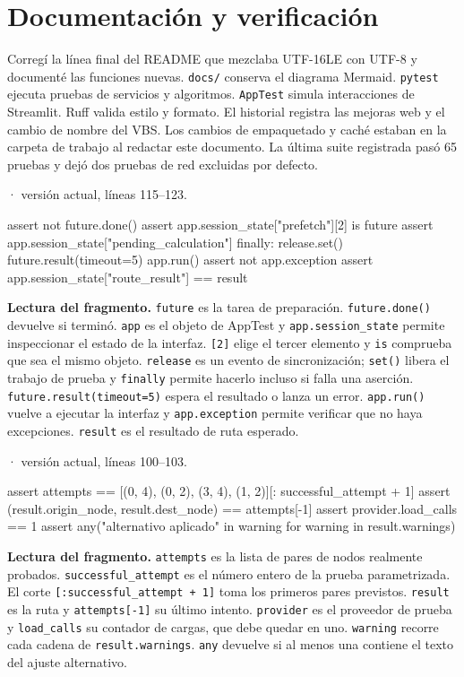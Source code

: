 \documentclass[11pt,a4paper]{article}
\begin{document}
\section{Documentación y verificación}
Corregí la línea final del README que mezclaba UTF-16LE con UTF-8 y documenté las funciones nuevas. \texttt{docs/} conserva el diagrama Mermaid. \texttt{pytest} ejecuta pruebas de servicios y algoritmos. \texttt{AppTest} simula interacciones de Streamlit. Ruff valida estilo y formato. El historial registra las mejoras web y el cambio de nombre del VBS. Los cambios de empaquetado y caché estaban en la carpeta de trabajo al redactar este documento. La última suite registrada pasó 65 pruebas y dejó dos pruebas de red excluidas por defecto.

\smallskip
{\footnotesize\texttt{} · versión actual, líneas 115--123.}\par
\begin{Codigo}[firstnumber=115]
        assert not future.done()
        assert app.session_state["prefetch"][2] is future
        assert app.session_state["pending_calculation"]
    finally:
        release.set()
    future.result(timeout=5)
    app.run()
    assert not app.exception
    assert app.session_state["route_result"] == result
\end{Codigo}

\textbf{Lectura del fragmento.} \texttt{future} es la tarea de preparación. \texttt{future.done()} devuelve si terminó. \texttt{app} es el objeto de AppTest y \texttt{app.session\_state} permite inspeccionar el estado de la interfaz. \texttt{[2]} elige el tercer elemento y \texttt{is} comprueba que sea el mismo objeto. \texttt{release} es un evento de sincronización; \texttt{set()} libera el trabajo de prueba y \texttt{finally} permite hacerlo incluso si falla una aserción. \texttt{future.result(timeout=5)} espera el resultado o lanza un error. \texttt{app.run()} vuelve a ejecutar la interfaz y \texttt{app.exception} permite verificar que no haya excepciones. \texttt{result} es el resultado de ruta esperado.


\smallskip
{\footnotesize\texttt{} · versión actual, líneas 100--103.}\par
\begin{Codigo}[firstnumber=100]
    assert attempts == [(0, 4), (0, 2), (3, 4), (1, 2)][: successful_attempt + 1]
    assert (result.origin_node, result.dest_node) == attempts[-1]
    assert provider.load_calls == 1
    assert any("alternativo aplicado" in warning for warning in result.warnings)
\end{Codigo}

\textbf{Lectura del fragmento.} \texttt{attempts} es la lista de pares de nodos realmente probados. \texttt{successful\_attempt} es el número entero de la prueba parametrizada. El corte \texttt{[:successful\_attempt + 1]} toma los primeros pares previstos. \texttt{result} es la ruta y \texttt{attempts[-1]} su último intento. \texttt{provider} es el proveedor de prueba y \texttt{load\_calls} su contador de cargas, que debe quedar en uno. \texttt{warning} recorre cada cadena de \texttt{result.warnings}. \texttt{any} devuelve si al menos una contiene el texto del ajuste alternativo.
\end{document}
